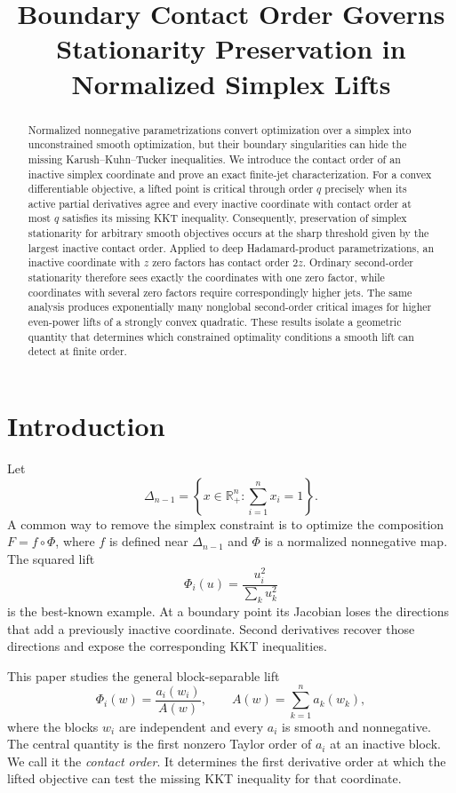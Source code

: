 \documentclass[11pt]{article}
\title{Boundary Contact Order Governs Stationarity Preservation in Normalized Simplex Lifts}
\author{}
\date{}
\theoremstyle{definition}
\theoremstyle{remark}
\newcommand{\R}{\mathbb{R}}
\newcommand{\simplex}{\Delta_{n-1}}
\begin{document}
\maketitle

\begin{abstract}
Normalized nonnegative parametrizations convert optimization over a simplex into unconstrained smooth optimization, but their boundary singularities can hide the missing Karush--Kuhn--Tucker inequalities. We introduce the contact order of an inactive simplex coordinate and prove an exact finite-jet characterization. For a convex differentiable objective, a lifted point is critical through order $q$ precisely when its active partial derivatives agree and every inactive coordinate with contact order at most $q$ satisfies its missing KKT inequality. Consequently, preservation of simplex stationarity for arbitrary smooth objectives occurs at the sharp threshold given by the largest inactive contact order. Applied to deep Hadamard-product parametrizations, an inactive coordinate with $z$ zero factors has contact order $2z$. Ordinary second-order stationarity therefore sees exactly the coordinates with one zero factor, while coordinates with several zero factors require correspondingly higher jets. The same analysis produces exponentially many nonglobal second-order critical images for higher even-power lifts of a strongly convex quadratic. These results isolate a geometric quantity that determines which constrained optimality conditions a smooth lift can detect at finite order.
\end{abstract}

\section{Introduction}

Let
\[
  \simplex=\left\{x\in\R^n_+:\sum_{i=1}^n x_i=1\right\}.
\]
A common way to remove the simplex constraint is to optimize the composition
$F=f\circ\Phi$, where $f$ is defined near $\simplex$ and $\Phi$ is a
normalized nonnegative map. The squared lift
\[
  \Phi_i(u)=\frac{u_i^2}{\sum_k u_k^2}
\]
is the best-known example. At a boundary point its Jacobian loses the
directions that add a previously inactive coordinate. Second derivatives
recover those directions and expose the corresponding KKT inequalities.

This paper studies the general block-separable lift
\begin{equation}\label{eq:lift}
  \Phi_i(w)=\frac{a_i(w_i)}{A(w)},
  \qquad
  A(w)=\sum_{k=1}^n a_k(w_k),
\end{equation}
where the blocks $w_i$ are independent and every $a_i$ is smooth and
nonnegative. The central quantity is the first nonzero Taylor order of
$a_i$ at an inactive block. We call it the \emph{contact order}. It determines
the first derivative order at which the lifted objective can test the
missing KKT inequality for that coordinate.
\end{document}

